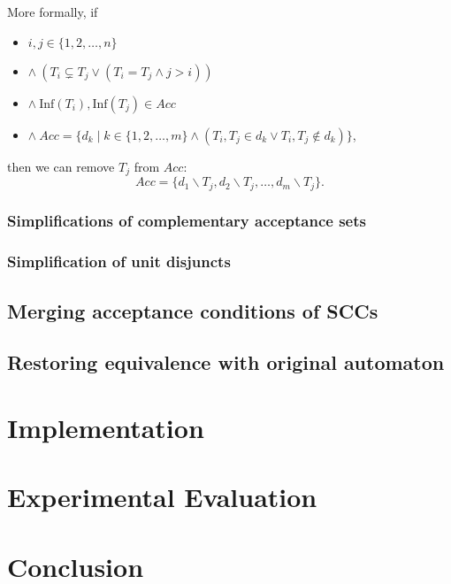 \documentclass[
  digital, %
  twoside, %
  table,   %
  lof,     %
  lot,     %
]{fithesis3}
\begin{document}
More formally, if 
\begin{itemize}
  \item $i, j \in \{1, 2, \dots, n\}$
  \item $\wedge \ (T_i \subsetneq T_j \vee (T_i = T_j \wedge j > i))$
  \item $\wedge \ \text{Inf}(T_i), \text{Inf}(T_j) \in Acc$
  \item $\wedge \ Acc = \{ d_k \mid k \in \{1, 2, \dots, m\} \wedge (T_i, T_j \in d_k \vee T_i, T_j \notin d_k)\}$,
\end{itemize}
then we can remove $T_j$ from $Acc$: 
\begin{equation*}
  Acc = \{d_1 \smallsetminus T_j, d_2 \smallsetminus T_j, \dots, d_m \smallsetminus T_j\}.
\end{equation*} 


\subsection{Simplifications of complementary acceptance sets}

\subsection{Simplification of unit disjuncts}

\section{Merging acceptance conditions of SCCs}

\section{Restoring equivalence with original automaton}


\chapter{Implementation}


\chapter{Experimental Evaluation}


\chapter{Conclusion}



\printbibliography[heading=bibintoc]
\end{document}
